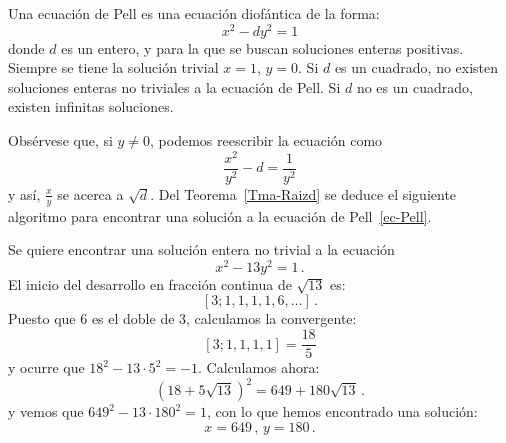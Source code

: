 Una ecuación de Pell es una ecuación diofántica de la forma:
\begin{equation}
x^2-dy^2=1\label{ec-Pell}
\end{equation}
donde $d$ es un entero, y para la que se buscan soluciones enteras positivas. Siempre se tiene la solución trivial $x=1$, $y=0$. Si $d$ es un cuadrado, no existen soluciones enteras no triviales a la ecuación de Pell. Si $d$ no es un cuadrado, existen infinitas soluciones.

Obsérvese que, si $y\neq0$, podemos reescribir la ecuación como
$$
\frac{x^2}{y^2}-d=\frac1{y^2}
$$
y así, $\frac xy$ se acerca a $\sqrt d$. Del Teorema~\ref{Tma-Raizd} se deduce el siguiente algoritmo para encontrar una solución a la ecuación de Pell~\eqref{ec-Pell}.

\begin{quotation}
	\end{quotation}
	
	\begin{ejem}
	Se quiere encontrar una solución entera no trivial a la ecuación
	$$ x^2-13y^2=1\,.$$
	El inicio del desarrollo en fracción continua de $\sqrt{13}$ es:
	$$[3;1,1,1,1,6,\dots]\,.$$
	Puesto que $6$ es el doble de $3$, calculamos la convergente:
	$$[3;1,1,1,1]=\frac{18}5$$
	y ocurre que $18^2-13\cdot5^2=-1$. Calculamos ahora:
	$$
	(18+5\sqrt{13})^2=649+180\sqrt{13}\,.
	$$
	y vemos que $649^2-13\cdot 180^2=1$, con lo que hemos encontrado una solución:
	$$ x= 649\,,\,y=180\,.$$
	
	\end{ejem}
	
